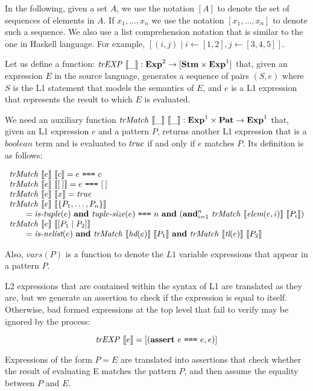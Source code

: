 In the following, given a set $A$, we use the notation $[A]$ to denote the set of 
sequences of elements in $A$. If $x_1, \ldots, x_n$ we use the notation 
$[x_1, \ldots, x_n]$ to denote such a sequence. We also use a list comprehension 
notation that is similar to the one in Haskell language. For example, 
$[(i, j) \mid i \leftarrow [1, 2], j \leftarrow [3, 4, 5]]$.

Let us define a function: $\mathit{trEXP}~\llbracket\_\rrbracket : \mathbf{Exp}^{2} \rightarrow [\mathbf{Stm} \times \mathbf{Exp}^{1}]$ 
that, given an expression $E$ in the source language, generates a sequence of pairs 
$(S, e)$ where $S$ is the L1 statement that models the semantics of $E$, and $e$ is a 
L1 expression that represents the result to which $E$ is evaluated.

We need an auxiliary function 
$\mathit{trMatch}~\llbracket\_\rrbracket~\llbracket\_\rrbracket : \mathbf{Exp}^{1} \times \mathbf{Pat} \rightarrow \mathbf{Exp}^{1}$ that, given an L1 
expression $e$ and a pattern $P$, returns another L1 expression that is a 
$\mathit{boolean}$ term and is evaluated to $\mathit{true}$ if and only if $e$ 
matches $P$. Its definition is as follows:

\[
\begin{array}{l}
\mathit{trMatch}~\llbracket e\rrbracket~\llbracket c\rrbracket = e~\texttt{===}~{c}\\
\mathit{trMatch}~\llbracket e\rrbracket~\llbracket[\:]\rrbracket = e~\texttt{===}~{[\:]} \\
\mathit{trMatch}~\llbracket e\rrbracket~\llbracket x\rrbracket = \mathit{true}\\
\mathit{trMatch}~\llbracket e\rrbracket~\llbracket\{P_1,\ldots,P_n\}\rrbracket\\
\qquad = \textit{is-tuple}(e)~\mathbf{and}~\textit{tuple-size}(e)~\texttt{===}~n~\mathbf{and}~(\mathbf{and}_{i=1}^n~\mathit{trMatch}~\llbracket\textit{elem}(e, i)\rrbracket~\llbracket P_i\rrbracket)\\
\mathit{trMatch}~\llbracket e\rrbracket~\llbracket[P_1\mid P_2]\rrbracket\\
\qquad = \textit{is-nelist}(e)~\mathbf{and}~\mathit{trMatch}~\llbracket\textit{hd}(e)\rrbracket~\llbracket P_1\rrbracket~\mathbf{and}~\mathit{trMatch}~\llbracket\textit{tl}(e)\rrbracket~\llbracket P_2\rrbracket
\end{array}
\]

Also, $\mathit{vars}(P)$ is a function to denote the $L1$ variable expressions that 
appear in a pattern $P$.

L2 expressions that are contained within the syntax of L1 are translated as they are, 
but we generate an assertion to check if the expression is equal to itself. Otherwise,
bad formed expressions at the top level that fail to verify may be ignored by the 
process:

\[
\mathit{trEXP}~\llbracket e\rrbracket = [(\textbf{assert}~e~\texttt{===}~e, e)]
\]

Expressions of the form $P = E$ are translated into assertions that check whether the
result of evaluating E matches the pattern $P$, and then assume the equality between 
$P$ and $E$.

